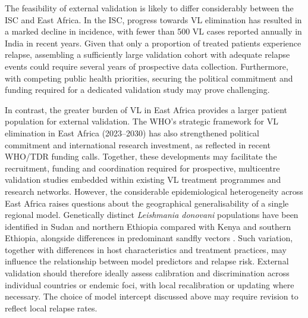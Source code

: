 \begin{mccorrection}

  The feasibility of external validation is likely to differ considerably between the ISC and East Africa. In the ISC, progress towards VL elimination has resulted in a marked decline in incidence, with fewer than 500 VL cases reported annually in India in recent years\cite{NCVBDC2025}. Given that only a proportion of treated patients experience relapse, assembling a sufficiently large validation cohort with adequate relapse events could require several years of prospective data collection. Furthermore, with competing public health priorities, securing the political commitment and funding required for a dedicated validation study may prove challenging.

  In contrast, the greater burden of VL in East Africa provides a larger patient population for external validation. The WHO's strategic framework for VL elimination in East Africa (2023--2030) has also strengthened political commitment and international research investment, as reflected in recent WHO/TDR funding calls\cite{TDR2025VisceralLeishmaniasis}. Together, these developments may facilitate the recruitment, funding and coordination required for prospective, multicentre validation studies embedded within existing VL treatment programmes and research networks. However, the considerable epidemiological heterogeneity across East Africa raises questions about the geographical generalisability of a single regional model. Genetically distinct \textit{Leishmania donovani} populations have been identified in Sudan and northern Ethiopia compared with Kenya and southern Ethiopia, alongside differences in predominant sandfly vectors \cite{gelanew2010}. Such variation, together with differences in host characteristics and treatment practices, may influence the relationship between model predictors and relapse risk. External validation should therefore ideally assess calibration and discrimination across individual countries or endemic foci, with local recalibration or updating where necessary. The choice of model intercept discussed above may require revision to reflect local relapse rates.

\end{mccorrection}



